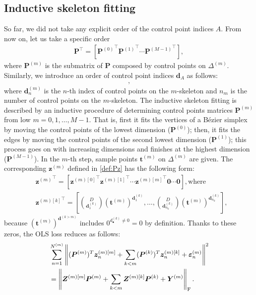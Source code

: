 \documentclass[letterpaper]{article} %
\theoremstyle{plain}
\newcommand{\norm}[1]{\left\| #1 \right\|}
\newcommand{\sqbra}[1]{\left[#1 \right]}
\begin{document}
\subsection{Inductive skeleton fitting}\label{sec:inductive-skeleton-fitting}
So far, we did not take any explicit order of the control point indices $A$.
From now on, let us take a specific order
\begin{align}
    \bm P^\top = [{\bm P^{(0)}}^\top {\bm P^{(1)}}^\top \cdots {\bm P^{(M - 1)}}^\top ],
\end{align}
where $\bm P^{(m)}$ is the submatrix of $\bm P$ composed by control points on $\Delta^{(m)}$.
Similarly, we introduce an order of control point indices $\bm d_A$ as follows:
\begin{align*}
    [
    \bm d_1^{(0)}, \dots, \bm d_{n_0}^{(0)},
    \bm d_1^{(1)}, \dots, \bm d_{n_1}^{(1)},
    \dots,
    \bm d_1^{(M - 1)}, \dots, \bm d_{n_{M - 1}}^{(M - 1)}
    ],
\end{align*}
where $\bm d^{(m)}_n$ is the $n$-th index of control points on the $m$-skeleton and $n_m$ is the number of control points on the $m$-skeleton.
The inductive skeleton fitting is described by an inductive procedure of determining control points matrices $\bm P^{(m)}$ from low $m = 0, 1, \dots, M - 1$.
That is, first it fits the vertices of a B\'ezier simplex by moving the control points of the lowest dimension ($\bm P^{(0)}$); then, it fits the edges by moving the control points of the second lowest dimension ($\bm P^{(1)}$); this process goes on with increasing dimensions and finishes at the highest dimension ($\bm P^{(M - 1)}$).
In the $m$-th step, sample points $\bm t^{(m)}$ on $\Delta^{(m)}$ are given.
The corresponding $\bm z^{(m)}$ defined in \cref{def:Pz} has the following form:
\begin{align*}
    &{\bm z^{(m)}}^\top
    =
    [
    {\bm z^{(m) [0]}}^\top
    {\bm z^{(m) [1]}}^\top
    \cdots
    {\bm z^{(m) [m]}}^\top
    \bm 0
    \cdots
    \bm 0
    ], \text{where}
    \\
    &
    {\bm z^{(m) [k]}}^\top
    =
    \sqbra{
    \binom{D}{\bm d_1^{(k)}}
    (\bm t^{(m)})^{\bm d_1^{(k)}}
    , \dots,
    \binom{D}{\bm d_{n_k}^{(k)}}
    (\bm t^{(m)})^{\bm d_{n_k}^{(k)}}
    },
\end{align*}
because $(\bm t^{(m)})^{\bm d^{(k>m)}}$ includes $0^{d_\bullet^{(k)}\neq 0} = 0$ by definition.
Thanks to these zeros, the OLS loss reduces as follows:
\begin{align}
    &
    \sum_{n = 1}^{N^{(m)}}
    \norm{
    (\bm P^{(m)})^T \bm z_n^{(m) [m]}
    +
    \sum_{k<m}
    (\bm P^{(k)})^T \bm z_n^{(m) [k]}
    +
    \bm \varepsilon_n^{(m)}
    }^2
    \notag \\
    &=
    \norm{\bm Z^{(m) [m]} \bm P^{(m)} + \sum_{k < m} \bm Z^{(m) [k]} \bm P^{(k)} + \bm Y^{(m)}}_\mathrm{F}.
    \label{eqn:OLS}
\end{align}
\end{document}
